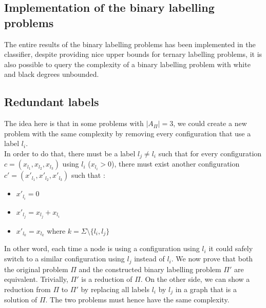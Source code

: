\subsection{Implementation of the binary labelling problems}
The entire results of the binary labelling problems has been implemented in the classifier, despite providing nice upper bounds for ternary labelling problems, it is also possible to query the complexity of a binary labelling problem with white and black degrees unbounded.
\subsection{Redundant labels}
The idea here is that in some problems with $|A_{\Pi}|=3$, we could create a new problem with the same complexity by removing every configuration that use a label $l_i$.\\
In order to do that, there must be a label $l_j\neq l_i$ such that for every configuration $c=(x_{l_1},x_{l_2},x_{l_3})$ using $l_i$ ($x_{l_i}>0$), there must exist another configuration $c'=(x'_{l_1},x'_{l_2},x'_{l_3})$ such that : 
\begin{itemize}
    \item $x'_{l_i}=0$
    \item $x'_{l_j}= x_{l_j}+x_{l_i}$
    \item $x'_{l_k} = x_{l_k}$ where $ k = \Sigma \setminus \{l_i,l_j\}$ 
\end{itemize}
In other word, each time a node is using a configuration using $l_i$ it could safely switch to a similar configuration using $l_j$ instead of $l_i$.
We now prove that both the original problem $\Pi$ and the constructed binary labelling problem $\Pi'$ are equivalent.
Trivially, $\Pi'$ is a reduction of $\Pi$. On the other side, we can show a reduction from $\Pi$ to $\Pi'$ by replacing all labels $l_i$ by $l_j$ in a graph that is a solution of $\Pi$. The two problems must hence have the same complexity.

